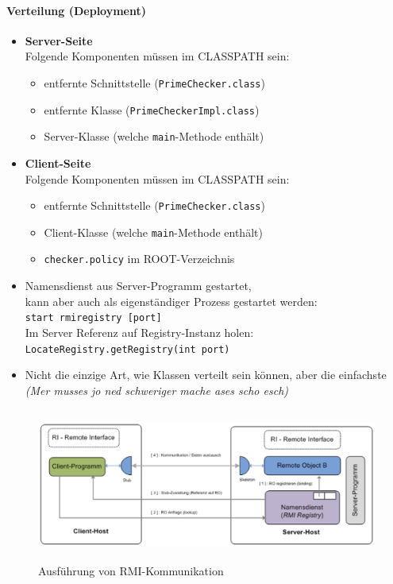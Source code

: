 \documentclass[a4paper]{article}
\begin{document}
				\paragraph{Verteilung (Deployment)}
				
					\begin{itemize}
						\item \textbf{Server-Seite}\\
						Folgende Komponenten müssen im CLASSPATH sein:
							\begin{itemize}
								\item entfernte Schnittstelle (\texttt{PrimeChecker.class})
								\item entfernte Klasse (\texttt{PrimeCheckerImpl.class})
								\item Server-Klasse (welche \texttt{main}-Methode enthält)
							\end{itemize}
						\item \textbf{Client-Seite}\\
						Folgende Komponenten müssen im CLASSPATH sein:
							\begin{itemize}
								\item entfernte Schnittstelle (\texttt{PrimeChecker.class})
								\item Client-Klasse (welche \texttt{main}-Methode enthält)
								\item \texttt{checker.policy} im ROOT-Verzeichnis
							\end{itemize}
						\item Namensdienst aus Server-Programm gestartet, \\
						kann aber auch als eigenständiger Prozess gestartet werden:\\
						\texttt{start rmiregistry [port]}\\
						Im Server Referenz auf Registry-Instanz holen:\\
						\texttt{LocateRegistry.getRegistry(int port)}
						\item Nicht die einzige Art, wie Klassen verteilt sein können, aber die einfachste\\
						\textit{(Mer musses jo ned schweriger mache ases scho esch)}
					\end{itemize}
				
				\newpage
				
					\begin{figure}[!htb]
						\centering
						\includegraphics[keepaspectratio, height=5cm]{img/rmi/rmi_execution.png}
						\caption{Ausführung von RMI-Kommunikation}
						\label{fig:rmi_execution}
					\end{figure}
	
\end{document}
